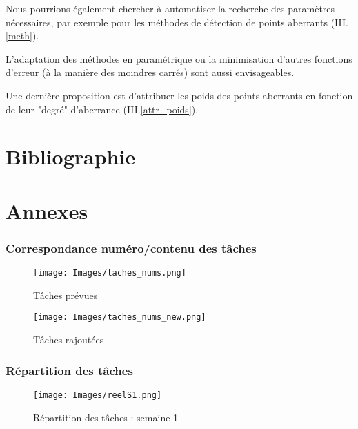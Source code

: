 \documentclass[a4paper,12pt]{article} %
\begin{document}
    Nous pourrions également chercher à automatiser la recherche des paramètres nécessaires, par exemple pour les méthodes de détection de points aberrants (III.\ref{meth}).
    
    L'adaptation des méthodes en paramétrique ou la minimisation d'autres fonctions d'erreur (à la manière des moindres carrés) sont aussi envisageables.
    
    Une dernière proposition est d'attribuer les poids des points aberrants en fonction de leur "degré" d'aberrance (III.\ref{attr_poids}).


\renewcommand\partname{}
\part{Bibliographie}

\printbibliography



\renewcommand\partname{}
\part{Annexes}

    \section{\label{annexe1}Correspondance numéro/contenu des tâches}
        
        	\begin{figure}[H]
        	    \centering
        	    \texttt{[image: Images/taches\_nums.png]}
        	    \caption{Tâches prévues}
        	\end{figure}
        
        	\begin{figure}[H]
        	    \centering
        	    \texttt{[image: Images/taches\_nums\_new.png]}
        	    \caption{Tâches rajoutées}
        	\end{figure}


	\section{\label{annexe2}Répartition des tâches}
	
	        \begin{figure}[H]
        	    \centering
        	    \texttt{[image: Images/reelS1.png]}
        	    \caption{Répartition des tâches : semaine 1}
        	\end{figure}
        	
\end{document}
